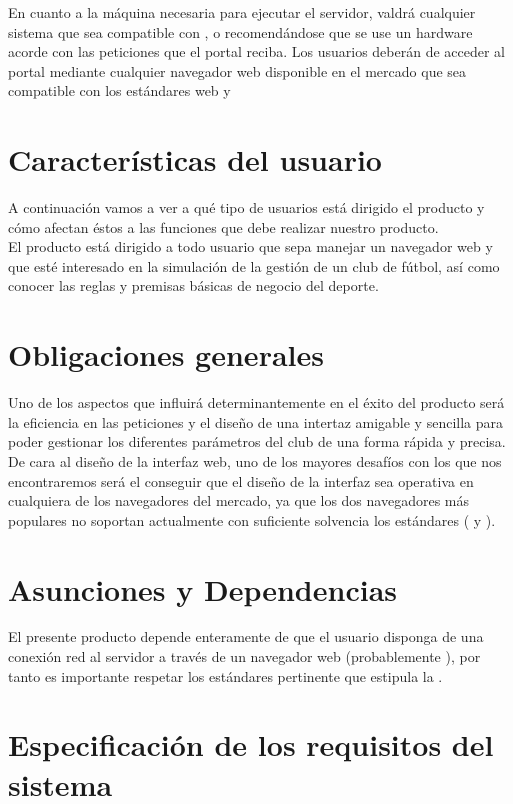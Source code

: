 En cuanto a la máquina necesaria para ejecutar el servidor, valdrá
cualquier sistema que sea compatible con ,  o 
recomendándose que se use un hardware acorde con las peticiones que el
portal reciba. Los usuarios deberán de acceder al portal mediante
cualquier navegador web disponible en el mercado que sea compatible
con los estándares web  y 

\section{Características del usuario}
A continuación vamos a ver a qué tipo de usuarios está dirigido el
producto y cómo afectan éstos a las funciones que debe realizar
nuestro producto.\\

El producto está dirigido a todo usuario que sepa manejar un navegador
web y que esté interesado en la simulación de la gestión de un club de
fútbol, así como conocer las reglas y premisas básicas de negocio del
deporte.
\section{Obligaciones generales}
Uno de los aspectos que influirá determinantemente en el éxito del
producto será la eficiencia en las peticiones y el diseño de una
intertaz amigable y sencilla para poder gestionar los diferentes
parámetros del club de una forma rápida y precisa.\\

De cara al diseño de la interfaz web, uno de los mayores desafíos con
los que nos encontraremos será el conseguir que el diseño de la
interfaz sea operativa en cualquiera de los navegadores del mercado,
ya que los dos navegadores más populares no soportan actualmente con
suficiente solvencia los estándares  ( y
).
\section{Asunciones y Dependencias}
El presente producto depende enteramente de que el usuario disponga de
una conexión red al servidor a través de un navegador web
(probablemente ), por tanto es importante respetar los
estándares pertinente que estipula la .\\

\section{Especificación de los requisitos del sistema}

